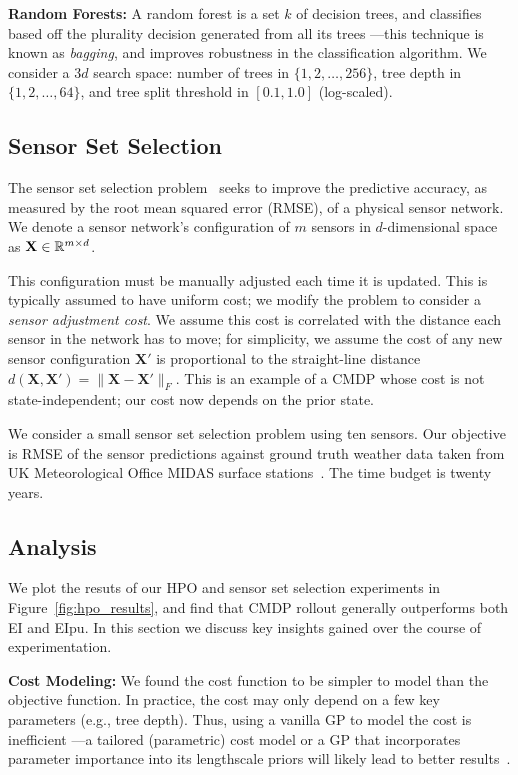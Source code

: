 \textbf{Random Forests:} A random forest is a set $k$ of decision trees, and classifies based off the plurality decision generated from all its trees ---this technique is known as \textit{bagging}, and improves robustness in the classification algorithm.
We consider a $3d$ search space: number of trees in $\{1, 2, \ldots, 256\}$, tree depth in $\{1, 2, \ldots, 64\}$, and tree split threshold in $[0.1, 1.0]$ (log-scaled).

\subsection{Sensor Set Selection}

The sensor set selection problem~\citep{garnett2010bayesian} seeks to improve the predictive accuracy, as measured by the root mean squared error (RMSE), of a physical sensor network.
We denote a sensor network's configuration of $m$ sensors in $d$-dimensional space as $\mathbf{X}\in{\mathbb R}^{m \times d}$.

This configuration must be manually adjusted each time it is updated.
This is typically assumed to have uniform cost; we modify the problem to consider a \textit{sensor adjustment cost}.
We assume this cost is correlated with the distance each sensor in the network has to move; for simplicity, we assume the cost of any new sensor configuration $\mathbf{X}'$ is proportional to the straight-line distance $d(\mathbf{X}, \mathbf{X}') = \|\mathbf{X} - \mathbf{X}'\|_F$.
This is an example of a CMDP whose cost is not state-independent; our cost now depends on the prior state.

We consider a small sensor set selection problem using ten sensors.
Our objective is RMSE of the sensor predictions against ground truth weather data taken from UK Meteorological Office MIDAS surface stations~\citep{midas2012}.
The time budget is twenty years.

\subsection{Analysis}
We plot the resuts of our HPO and sensor set selection experiments in Figure~\ref{fig:hpo_results}, and find that CMDP rollout generally outperforms both EI and EIpu.
In this section we discuss key insights gained over the course of experimentation.

\textbf{Cost Modeling:} We found the cost function to be simpler to model than the objective function.
In practice, the cost may only depend on a few key parameters (e.g., tree depth).
Thus, using a vanilla GP to model the cost is inefficient ---a tailored (parametric) cost model or a GP that incorporates parameter importance into its lengthscale priors will likely lead to better results~\citep{lee2020cost, guinet2020}.

